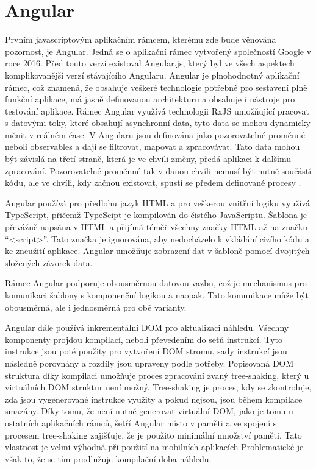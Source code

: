     \section{Angular}
Prvním javascriptovým aplikačním rámcem, kterému zde bude věnována pozornost, je Angular. Jedná se o aplikační rámec vytvořený společností Google v roce 2016. Před touto verzí existoval Angular.js, který byl ve všech aspektech komplikovanější verzí stávajícího Angularu. Angular je plnohodnotný aplikační rámec, což znamená, že obsahuje veškeré technologie potřebné pro sestavení plně funkční aplikace, má jasně definovanou architekturu a obsahuje i nástroje pro testování aplikace. Rámec Angular využívá technologii RxJS umožňující pracovat s datovými toky, které obsahují asynchronní data, tyto data se mohou dynamicky měnit v reálném čase. V Angularu jsou definována jako pozorovatelné proměnné neboli observables a dají se filtrovat, mapovat a zpracovávat. Tato data mohou být závislá na třetí straně, která je ve chvíli změny, předá aplikaci k dalšímu zpracování. Pozorovatelné proměnné tak v danou chvíli nemusí být nutně součástí kódu, ale ve chvíli, kdy začnou existovat, spustí se předem definované procesy \cite{angularforenterprise}.

Angular používá pro předlohu jazyk HTML a pro veškerou vnitřní logiku využívá TypeScript, přičemž TypeScipt je kompilován do čistého JavaScriptu. Šablona je převážně napsána v HTML a přijímá téměř všechny značky HTML až na značku “<script>”. Tato značka je ignorována, aby nedocházelo k vkládání cizího kódu a ke zneužití aplikace. Angular umožňuje zobrazení dat v šabloně pomocí dvojitých složených závorek {{data}}.

Rámec Angular podporuje obousměrnou datovou vazbu, což je mechanismus pro komunikaci šablony s komponenční logikou a naopak. Tato komunikace může být obousměrná, ale i jednosměrná pro obě varianty. 

Angular dále používá inkrementální DOM pro aktualizaci náhledů. Všechny komponenty projdou kompilací, neboli převedením do setů instrukcí. Tyto instrukce jsou poté použity pro vytvoření DOM stromu, sady instrukcí jsou následně porovnány a rozdíly jsou upraveny podle potřeby. Popisovaná DOM struktura díky kompilaci umožňuje proces zpracování zvaný tree-shaking, který u virtuálních DOM struktur není možný. Tree-shaking je proces, kdy se zkontroluje, zda jsou vygenerované instrukce využity a pokud nejsou, jsou během kompilace smazány. Díky tomu, že není nutné generovat virtuální DOM, jako je tomu u ostatních aplikačních rámců, šetří Angular místo v paměti a ve spojení s procesem tree-shaking zajišťuje, že je použito minimální množství paměti. Tato vlastnost je velmi výhodná při použití na mobilních aplikacích Problematické je však to, že se tím prodlužuje kompilační doba náhledu. 

